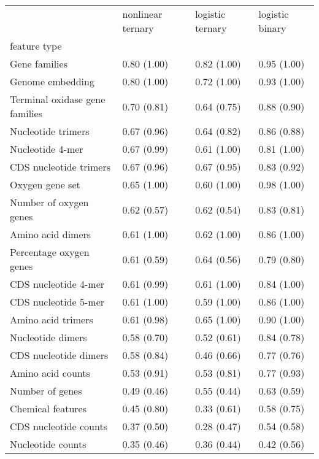 \begin{tabular}{llll}
\toprule
 & nonlinear ternary & logistic ternary & logistic binary \\
feature type &  &  &  \\
\midrule
Gene families & 0.80 (1.00) & 0.82 (1.00) & 0.95 (1.00) \\
Genome embedding & 0.80 (1.00) & 0.72 (1.00) & 0.93 (1.00) \\
Terminal oxidase gene families & 0.70 (0.81) & 0.64 (0.75) & 0.88 (0.90) \\
Nucleotide trimers & 0.67 (0.96) & 0.64 (0.82) & 0.86 (0.88) \\
Nucleotide 4-mer & 0.67 (0.99) & 0.61 (1.00) & 0.81 (1.00) \\
CDS nucleotide trimers & 0.67 (0.96) & 0.67 (0.95) & 0.83 (0.92) \\
Oxygen gene set & 0.65 (1.00) & 0.60 (1.00) & 0.98 (1.00) \\
Number of oxygen genes & 0.62 (0.57) & 0.62 (0.54) & 0.83 (0.81) \\
Amino acid dimers & 0.61 (1.00) & 0.62 (1.00) & 0.86 (1.00) \\
Percentage oxygen genes & 0.61 (0.59) & 0.64 (0.56) & 0.79 (0.80) \\
CDS nucleotide 4-mer & 0.61 (0.99) & 0.61 (1.00) & 0.84 (1.00) \\
CDS nucleotide 5-mer & 0.61 (1.00) & 0.59 (1.00) & 0.86 (1.00) \\
Amino acid trimers & 0.61 (0.98) & 0.65 (1.00) & 0.90 (1.00) \\
Nucleotide dimers & 0.58 (0.70) & 0.52 (0.61) & 0.84 (0.78) \\
CDS nucleotide dimers & 0.58 (0.84) & 0.46 (0.66) & 0.77 (0.76) \\
Amino acid counts & 0.53 (0.91) & 0.53 (0.81) & 0.77 (0.93) \\
Number of genes & 0.49 (0.46) & 0.55 (0.44) & 0.63 (0.59) \\
Chemical features & 0.45 (0.80) & 0.33 (0.61) & 0.58 (0.75) \\
CDS nucleotide counts & 0.37 (0.50) & 0.28 (0.47) & 0.54 (0.58) \\
Nucleotide counts & 0.35 (0.46) & 0.36 (0.44) & 0.42 (0.56) \\
\bottomrule
\end{tabular}
